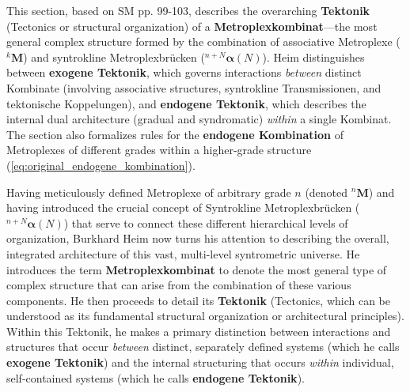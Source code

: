 \documentclass[12pt]{article}
\newcommand{\metroplex}[1]{{}^{#1}\mathbf{M}}
\newcommand{\syntroklinebruecke}[1]{{}^{#1}\bm{\alpha}}
\begin{document}
This section, based on SM pp. 99-103, describes the overarching \textbf{Tektonik} (Tectonics or structural organization) of a \textbf{Metroplexkombinat}—the most general complex structure formed by the combination of associative Metroplexe (\(\metroplex{k}\)) and syntrokline Metroplexbrücken (\(\syntroklinebruecke{n+N}(N)\)). Heim distinguishes between \textbf{exogene Tektonik}, which governs interactions \textit{between} distinct Kombinate (involving associative structures, syntrokline Transmissionen, and tektonische Koppelungen), and \textbf{endogene Tektonik}, which describes the internal dual architecture (gradual and syndromatic) \textit{within} a single Kombinat. The section also formalizes rules for the \textbf{endogene Kombination} of Metroplexes of different grades within a higher-grade structure (\eqref{eq:original_endogene_kombination}).

Having meticulously defined Metroplexe of arbitrary grade \( n \) (denoted \( \metroplex{n} \)) and having introduced the crucial concept of Syntrokline Metroplexbrücken (\( \syntroklinebruecke{n+N}(N) \)) that serve to connect these different hierarchical levels of organization, Burkhard Heim now turns his attention to describing the overall, integrated architecture of this vast, multi-level syntrometric universe. He introduces the term \textbf{Metroplexkombinat} to denote the most general type of complex structure that can arise from the combination of these various components. He then proceeds to detail its \textbf{Tektonik} (Tectonics, which can be understood as its fundamental structural organization or architectural principles). Within this Tektonik, he makes a primary distinction between interactions and structures that occur \textit{between} distinct, separately defined systems (which he calls \textbf{exogene Tektonik}) and the internal structuring that occurs \textit{within} individual, self-contained systems (which he calls \textbf{endogene Tektonik}).
\end{document}
